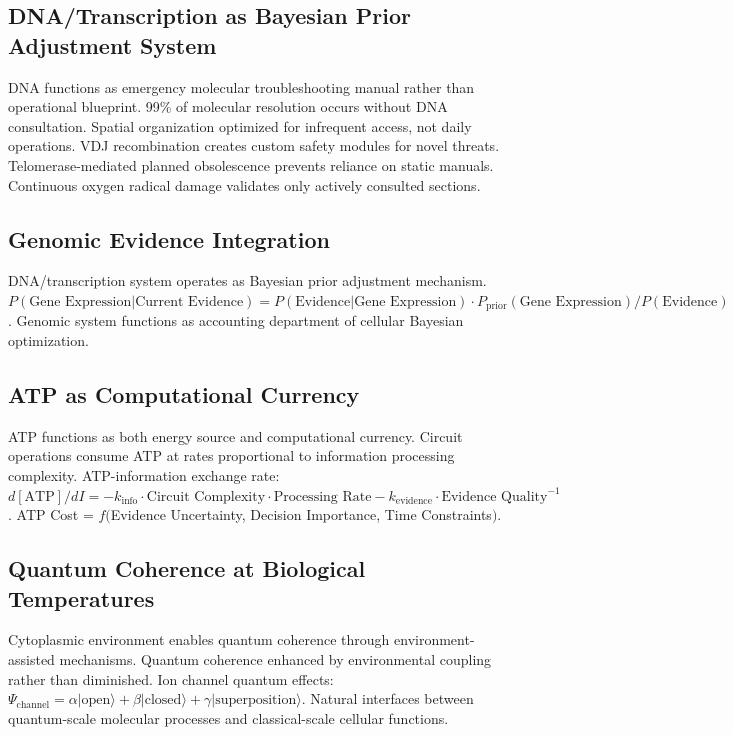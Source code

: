 \documentclass[12pt,a4paper]{article}
\begin{document}
\subsection{DNA/Transcription as Bayesian Prior Adjustment System}

DNA functions as emergency molecular troubleshooting manual rather than operational blueprint. 99\% of molecular resolution occurs without DNA consultation. Spatial organization optimized for infrequent access, not daily operations. VDJ recombination creates custom safety modules for novel threats. Telomerase-mediated planned obsolescence prevents reliance on static manuals. Continuous oxygen radical damage validates only actively consulted sections.

\subsection{Genomic Evidence Integration}

DNA/transcription system operates as Bayesian prior adjustment mechanism. $P(\text{Gene Expression} | \text{Current Evidence}) = P(\text{Evidence} | \text{Gene Expression}) \cdot P_{\text{prior}}(\text{Gene Expression}) / P(\text{Evidence})$. Genomic system functions as accounting department of cellular Bayesian optimization.

\subsection{ATP as Computational Currency}

ATP functions as both energy source and computational currency. Circuit operations consume ATP at rates proportional to information processing complexity. ATP-information exchange rate: $d[\text{ATP}]/dI = -k_{\text{info}} \cdot \text{Circuit Complexity} \cdot \text{Processing Rate} - k_{\text{evidence}} \cdot \text{Evidence Quality}^{-1}$. ATP Cost = $f($Evidence Uncertainty, Decision Importance, Time Constraints$)$.

\subsection{Quantum Coherence at Biological Temperatures}

Cytoplasmic environment enables quantum coherence through environment-assisted mechanisms. Quantum coherence enhanced by environmental coupling rather than diminished. Ion channel quantum effects: $\Psi_{\text{channel}} = \alpha|\text{open}\rangle + \beta|\text{closed}\rangle + \gamma|\text{superposition}\rangle$. Natural interfaces between quantum-scale molecular processes and classical-scale cellular functions.
\end{document}
